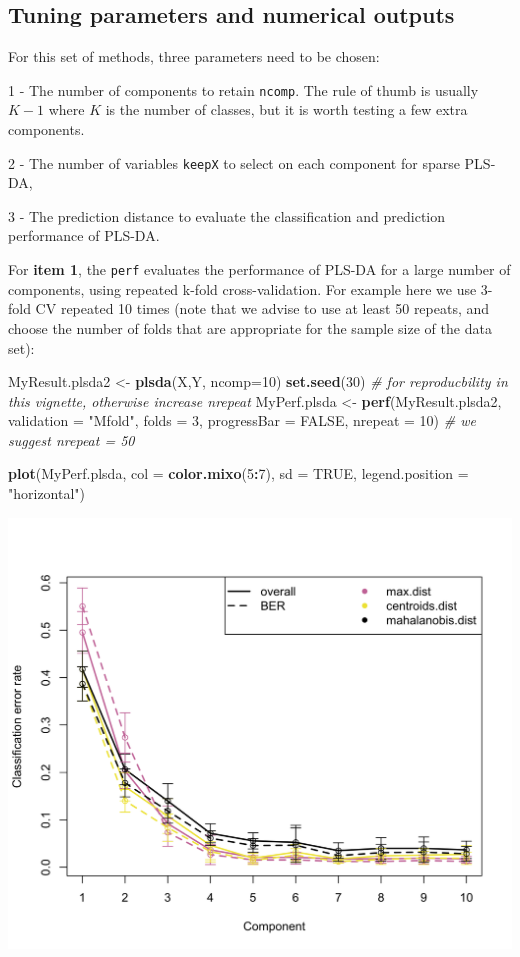 \documentclass[]{book}
\newenvironment{Shaded}{\begin{snugshade}}{\end{snugshade}}
\newcommand{\KeywordTok}[1]{\textcolor[rgb]{0.13,0.29,0.53}{\textbf{#1}}}
\newcommand{\DataTypeTok}[1]{\textcolor[rgb]{0.13,0.29,0.53}{#1}}
\newcommand{\DecValTok}[1]{\textcolor[rgb]{0.00,0.00,0.81}{#1}}
\newcommand{\StringTok}[1]{\textcolor[rgb]{0.31,0.60,0.02}{#1}}
\newcommand{\CommentTok}[1]{\textcolor[rgb]{0.56,0.35,0.01}{\textit{#1}}}
\newcommand{\OtherTok}[1]{\textcolor[rgb]{0.56,0.35,0.01}{#1}}
\newcommand{\OperatorTok}[1]{\textcolor[rgb]{0.81,0.36,0.00}{\textbf{#1}}}
\newcommand{\NormalTok}[1]{#1}
\theoremstyle{definition}
\theoremstyle{definition}
\theoremstyle{definition}
\theoremstyle{remark}
\begin{document}
\subsection{Tuning parameters and numerical
outputs}\label{tuning:sPLSDA}

For this set of methods, three parameters need to be chosen:

1 - The number of components to retain \texttt{ncomp}. The rule of thumb
is usually \(K - 1\) where \(K\) is the number of classes, but it is
worth testing a few extra components.

2 - The number of variables \texttt{keepX} to select on each component
for sparse PLS-DA,

3 - The prediction distance to evaluate the classification and
prediction performance of PLS-DA.

For \textbf{item 1}, the \texttt{perf} evaluates the performance of
PLS-DA for a large number of components, using repeated k-fold
cross-validation. For example here we use 3-fold CV repeated 10 times
(note that we advise to use at least 50 repeats, and choose the number
of folds that are appropriate for the sample size of the data set):

\begin{Shaded}
\begin{Highlighting}[]
\NormalTok{MyResult.plsda2 <-}\StringTok{ }\KeywordTok{plsda}\NormalTok{(X,Y, }\DataTypeTok{ncomp=}\DecValTok{10}\NormalTok{)}
\KeywordTok{set.seed}\NormalTok{(}\DecValTok{30}\NormalTok{) }\CommentTok{# for reproducbility in this vignette, otherwise increase nrepeat}
\NormalTok{MyPerf.plsda <-}\StringTok{ }\KeywordTok{perf}\NormalTok{(MyResult.plsda2, }\DataTypeTok{validation =} \StringTok{"Mfold"}\NormalTok{, }\DataTypeTok{folds =} \DecValTok{3}\NormalTok{, }
                  \DataTypeTok{progressBar =} \OtherTok{FALSE}\NormalTok{, }\DataTypeTok{nrepeat =} \DecValTok{10}\NormalTok{) }\CommentTok{# we suggest nrepeat = 50}

\KeywordTok{plot}\NormalTok{(MyPerf.plsda, }\DataTypeTok{col =} \KeywordTok{color.mixo}\NormalTok{(}\DecValTok{5}\OperatorTok{:}\DecValTok{7}\NormalTok{), }\DataTypeTok{sd =} \OtherTok{TRUE}\NormalTok{, }\DataTypeTok{legend.position =} \StringTok{"horizontal"}\NormalTok{)}
\end{Highlighting}
\end{Shaded}

\begin{center}\includegraphics[width=0.5\linewidth]{Figures/unnamed-chunk-13-1} \end{center}
\end{document}
